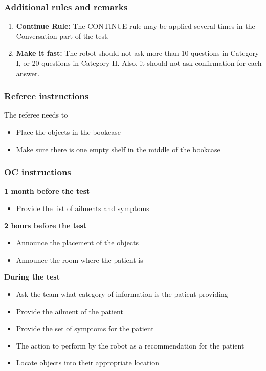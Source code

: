 \subsubsection{Additional rules and remarks}
\begin{enumerate}
\item \textbf{Continue Rule:} The CONTINUE rule may be applied several times in the Conversation part of the test.
\item \textbf{Make it fast:} The robot should not ask more than 10 questions in Category I, or 20 questions in Category II. Also, it should not ask confirmation for each answer.
\end{enumerate}

\subsubsection{Referee instructions}

The referee needs to
\begin{itemize}
\item Place the objects in the bookcase
\item Make sure there is one empty shelf in the middle of the bookcase
\end{itemize}

\subsubsection{OC instructions}

\textbf{1 month before the test}
\begin{itemize}
\item Provide the list of ailments and symptoms
\end{itemize}
\textbf{2 hours before the test}
\begin{itemize}
\item Announce the placement of the objects
\item Announce the room where the patient is
\end{itemize}
\textbf{During the test}
\begin{itemize}
\item Ask the team what category of information is the patient providing
\item Provide the ailment of the patient
\item Provide the set of symptoms for the patient
\item The action to perform by the robot as a recommendation for the patient
\item Locate objects into their appropriate location
\end{itemize}

